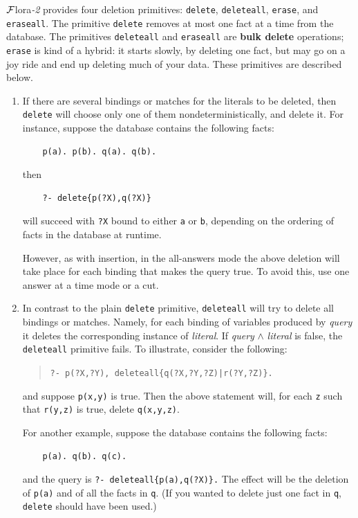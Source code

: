 \documentclass[11pt]{article}
\newcommand{\FLSYSTEM}{{\mbox{\sc ${\cal F}${lora}\rm\emph{-2}}}\xspace}
\begin{document}
\FLSYSTEM provides four deletion primitives: {\tt delete}, {\tt deleteall},
{\tt erase}, and {\tt eraseall}. The primitive {\tt delete} removes at most
one fact at a time from the database. The primitives {\tt deleteall} and
{\tt eraseall} are {\bf bulk delete} operations; {\tt erase} is kind of a
hybrid: it starts slowly, by deleting one fact, but may go on a joy ride
and end up deleting much of your data. These primitives are described
below.
\begin{enumerate}
\item If there are several bindings or matches for the literals to be
  deleted, then {\tt delete} will choose only one of them
  nondeterministically, and delete it.  For instance, suppose the database
  contains the following facts:
  \begin{verbatim}
    p(a). p(b). q(a). q(b).
  \end{verbatim}
  then
  \begin{verbatim}
    ?- delete{p(?X),q(?X)}
  \end{verbatim}
  will succeed with {\tt ?X} bound to either {\tt a} or {\tt b},
  depending on the ordering of facts in the database at runtime.

  However, as with insertion, in the all-answers mode the above deletion
  will take place for each binding that makes the query true. To avoid
  this, use one answer at a time mode or a cut.
      
\item In contrast to the plain {\tt delete} primitive, {\tt deleteall} will
  try to delete all bindings or matches.  Namely, for each binding of
  variables produced by \emph{query} it deletes the corresponding instance
  of \emph{literal}. If \emph{query} $\wedge$ \emph{literal} is false, the
  {\tt deleteall} primitive fails.  To illustrate, consider the following:
  \begin{quote}
    {\tt ?- p(?X,?Y), deleteall\{q(?X,?Y,?Z)|r(?Y,?Z)\}.}
  \end{quote}
  and suppose {\tt p(x,y)} is true. Then the above statement will, for
  each {\tt z} such that {\tt r(y,z)} is true,
  delete {\tt q(x,y,z)}.
  
  For another example, suppose the database contains the following facts:
  \begin{verbatim}
    p(a). q(b). q(c).
  \end{verbatim}
  and the query is {\tt ?- deleteall\{p(a),q(?X)\}.} The effect will be 
  the deletion of {\tt p(a)} and of all the facts in {\tt q}. (If you
  wanted to delete just one fact in {\tt q}, {\tt delete} should
  have been used.)
  

\end{enumerate}
\end{document}

